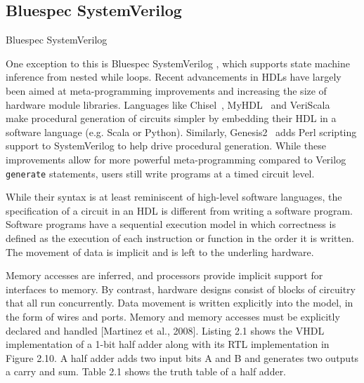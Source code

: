%
\subsection{Bluespec SystemVerilog}
Bluespec SystemVerilog~\cite{bluespec}
% 


One exception to this is Bluespec SystemVerilog \cite{bluespec}, which supports state machine inference from nested while loops.
Recent advancements in HDLs have largely been aimed at meta-programming improvements and increasing the size of hardware module libraries.
Languages like Chisel~\cite{chisel}, MyHDL~\cite{decaluwe_2004_myhdl} and VeriScala~\cite{veriscala} make procedural generation of circuits simpler by embedding their HDL in a software language (e.g. Scala or Python). Similarly, Genesis2~\cite{genesis2} adds Perl scripting support to SystemVerilog to help drive procedural generation. While these improvements allow for more powerful meta-programming compared to Verilog \texttt{\small{generate}} statements, users still write programs at a timed circuit level.








While their syntax is at least reminiscent of high-level software languages, the specification of a circuit in an HDL is different from writing a software program. Software programs have a sequential execution model in which correctness is defined as the execution of each instruction or function in the order it is written.
The movement of data is implicit and is left to the underling hardware.

Memory accesses are inferred, and processors provide implicit support for interfaces to memory. By contrast, hardware designs consist of blocks of circuitry that all run concurrently. Data movement is written explicitly into the model, in the form of wires and ports. Memory and memory accesses must be explicitly declared and handled [Martinez et al., 2008]. Listing 2.1 shows the VHDL implementation of a 1-bit half adder along with its RTL implementation in Figure 2.10. A half adder adds two input bits A and B and generates two outputs a carry and sum. Table 2.1 shows the truth table of a half adder.







